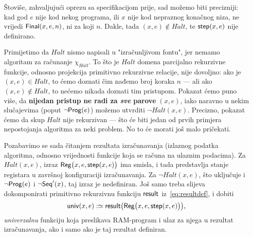 \begin{napomena}\label{nap:HaltProg}
Štoviše, zahvaljujući oprezu sa specifikacijom prije, sad možemo biti precizniji: kad god $e$ nije kod nekog programa, ili $x$ nije kod nepraznog konačnog niza, ne vrijedi  $\mathsf{Final}(x,e,n)$, ni za koji $n$. Dakle, tada $(x,e)\not\in H\dot alt$, te $\mathsf{step}(x,e)$ nije definirano.
\end{napomena}

Primijetimo da $H\dot alt$ nismo napisali u "izračunljivom fontu", jer nemamo algoritam za računanje $\chi_{H\dot alt}$. To što je $H\dot alt$ domena parcijalno rekurzivne funkcije, odnosno projekcija primitivno rekurzivne relacije, nije dovoljno: ako je $(x,e)\in H\dot alt$, to ćemo doznati čim nađemo broj koraka $n$ --- ali ako $(x,e)\not\in H\dot alt$, to nećemo nikada doznati tim pristupom. Pokazat ćemo puno više, da \textbf{nijedan pristup ne radi za \emph{sve} parove} $(x,e)$, iako naravno u nekim slučajevima (poput $\lnot\mathsf{Prog}(e)$) možemo utvrditi $\lnot H\dot alt(x,e)$. Precizno, pokazat ćemo da skup $H\dot alt$ nije rekurzivan --- što će biti jedan od prvih primjera nepostojanja algoritma za neki problem. No to će morati još malo pričekati.

Pozabavimo se sada čitanjem rezultata izračunavanja (izlaznog podatka algoritma, odnosno vrijednosti funkcije koja se računa na ulaznim podacima). Za $H\dot alt(x,e)$, izraz $\mathsf{Reg}\bigl(x,e,\mathsf{step}(x,e)\bigr)$ ima smisla, i tada predstavlja stanje registara u završnoj konfiguraciji izračunavanja. Za $\lnot H\dot alt(x,e)$, što uključuje i $\lnot\mathsf{Prog}(e)$ i $\lnot\mathsf{Seq}'(x)$, taj izraz je nedefiniran. Još samo treba slijeva dokomponirati primitivno rekurzivnu funkciju $\mathsf{result}$ iz~\eqref{eq:resultdef}, i dobiti
\begin{equation}
\label{eq:univdef}\mathsf{univ}(x,e):\simeq\mathsf{result}\bigl(\mathsf{Reg}\bigl(x,e,\mathsf{step}(x,e)\bigr)\bigr)\text,
\end{equation}
\emph{univerzalnu} funkciju koja preslikava RAM-program i ulaz za njega u rezultat iz\-ra\-ču\-na\-va\-nja, ako i samo ako je taj rezultat definiran.

